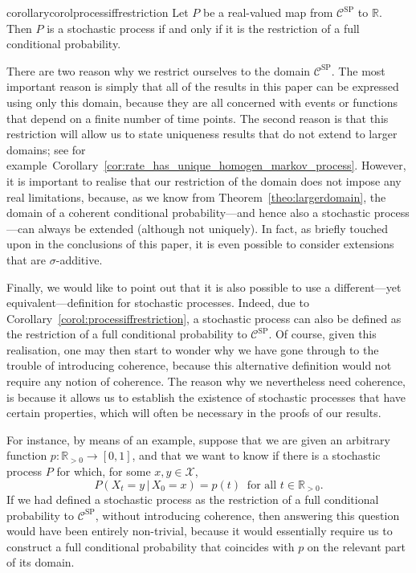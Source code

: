 \documentclass[10pt,a4paper]{paper}
\theoremstyle{definition}
\newcommand{\reals}{\mathbb{R}}
\newcommand{\realspos}{\reals_{>0}}
\newcommand{\states}{\mathcal{X}}
\begin{document}
\begin{restatable}{corollary}{corolprocessiffrestriction}
\label{corol:processiffrestriction}
Let $P$ be a real-valued map from $\mathcal{C}^\mathrm{SP}$ to $\reals$. Then $P$ is a stochastic process if and only if it is the restriction of a full conditional probability.
\end{restatable}

There are two reason why we restrict ourselves to the domain $\mathcal{C}^\mathrm{SP}$. The most important reason is simply that all of the results in this paper can be expressed using only this domain, because they are all concerned with events or functions that depend on a finite number of time points. The second reason is that this restriction will allow us to state  uniqueness results that do not extend to larger domains; see for example~Corollary~\ref{cor:rate_has_unique_homogen_markov_process}. However, it is important to realise that our restriction of the domain does not impose any real limitations, because, as we know from Theorem~\ref{theo:largerdomain}, the domain of a coherent conditional probability---and hence also a stochastic process---can always be extended (although not uniquely). In fact, as briefly touched upon in the conclusions of this paper, it is even possible to consider extensions that are $\sigma$-additive.


Finally, we would like to point out that it is also possible to use a different---yet equivalent---definition for stochastic processes. Indeed, due to Corollary~\ref{corol:processiffrestriction}, a stochastic process can also be defined as the restriction of a full conditional probability to $\mathcal{C}^{\mathrm{SP}}$. Of course, given this realisation, one may then start to wonder why we have gone through to the trouble of introducing coherence, because this alternative definition would not require any notion of coherence. The reason why we nevertheless need coherence, is because it allows us to establish the existence of stochastic processes that have certain properties, which will often be necessary in the proofs of our results.

For instance, by means of an example, suppose that we are given an arbitrary function $p:\realspos\to [0,1]$, and that we want to know if there is a stochastic process $P$ for which, for some $x,y\in\states$,
\begin{equation}\label{eq:extendptoP}
P(X_t=y\,\vert\,X_0=x) = p(t)
~\text{ for all $t\in\realspos$.}
\end{equation}
If we had defined a stochastic process as the restriction of a full conditional probability to $\mathcal{C}^\mathrm{SP}$, without introducing coherence, then answering this question would have been entirely non-trivial, because it would essentially require us to construct a full conditional probability that coincides with $p$ on the relevant part of its domain.
\end{document}
